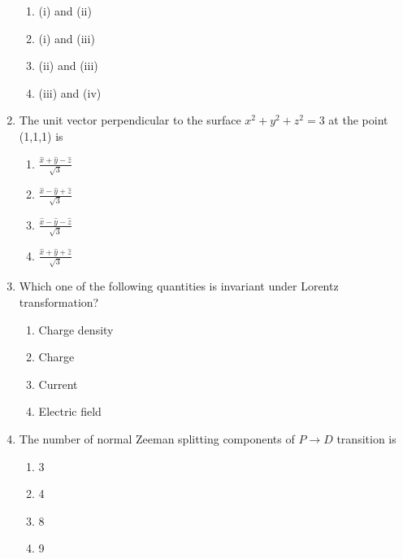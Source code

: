 \documentclass[journal,12pt,onecolumn]{IEEEtran}
\theoremstyle{remark}
\begin{document}
\begin{enumerate}
\begin{enumerate}
    \item (i) and (ii)
    \item (i) and (iii)
    \item (ii) and (iii)
    \item (iii) and (iv)
\end{enumerate}
 \item The unit vector perpendicular to the surface $x^2 + y^2 + z^2 = 3$ at the point (1,1,1) is
        \begin{enumerate}
            \item $\frac{\hat{x} + \hat{y} - \hat{z}}{\sqrt{3}}$
            \item $\frac{\hat{x} - \hat{y} + \hat{z}}{\sqrt{3}}$
            \item $\frac{\hat{x} - \hat{y} - \hat{z}}{\sqrt{3}}$
            \item $\frac{\hat{x} + \hat{y} + \hat{z}}{\sqrt{3}}$
        \end{enumerate}

    \item Which one of the following quantities is invariant under Lorentz transformation?
        \begin{enumerate}
            \item Charge density
            \item Charge
            \item Current
            \item Electric field
        \end{enumerate}

    \item The number of normal Zeeman splitting components of $P \rightarrow D$ transition is
        \begin{enumerate}
            \item 3
            \item 4
            \item 8
            \item 9
        \end{enumerate}
\end{enumerate}
\end{document}
